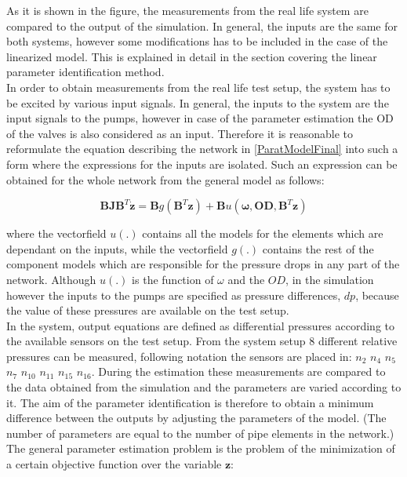 As it is shown in the figure, the measurements from the real life system are compared to the output of the simulation. In general, the inputs are the same for both systems, however some modifications has to be included in the case of the linearized model. This is explained in detail in the section covering the linear parameter identification method.
\\
In order to obtain measurements from the real life test setup, the system has to be excited by various input signals. In general, the inputs to the system are the input signals to the pumps, however in case of the parameter estimation the OD of the valves is also considered as an input. Therefore it is reasonable to reformulate the equation describing the network in \eqref{ParatModelFinal} into such a form where the expressions for the inputs are isolated. Such an expression can be obtained for the whole network from the general model as follows: 

\begin{equation}
 \pmb{B}\pmb{J {B}}^T \pmb{\dot{z}} = \pmb{B} g(\pmb{B}^T \pmb{z})+ \pmb{B} u(\pmb{\omega},\pmb{OD}, \pmb{B}^T \pmb{z})
 \label{InputOutputmodel}
\end{equation}

where the vectorfield $u(.)$ contains all the models for the elements which are dependant on the inputs, while the vectorfield $g(.)$ contains the rest of the component models which are responsible for the pressure drops in any part of the network. Although $u(.)$ is the function of $\omega$ and the $OD$, in the simulation however the inputs to the pumps are specified as pressure differences, $dp$, because the value of these pressures are available on the test setup. 
\\
In the system, output equations are defined as differential pressures according to the available sensors on the test setup. From the system setup $8$ different relative pressures can be measured, following  notation the sensors are placed in: 
$n_2$ $n_4$ $n_5$ $n_7$ $n_{10}$ $n_{11}$ $n_{15}$ $n_{16}$. During the estimation these measurements are compared to the data obtained from the simulation and the parameters are varied according to it. The aim of the parameter identification is therefore to obtain a minimum difference between the outputs by adjusting the parameters of the model. (The number of parameters are equal to the number of pipe elements in the network.) The general parameter estimation problem is the problem of the minimization of a certain objective function over the variable $\pmb{z}$: 

